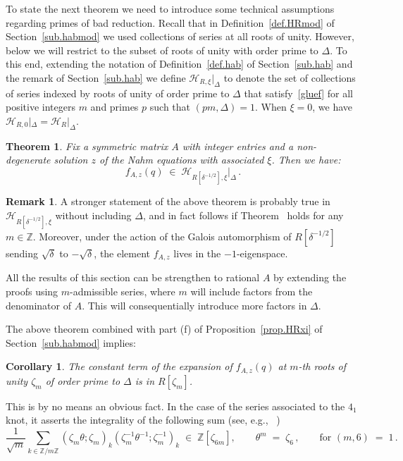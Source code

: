 \documentclass[12pt,reqno]{amsart}
\newcounter{theoremcount}
\newtheorem{theorem}[theoremcount]{Theorem}
\newtheorem{corollary}[proposition]{Corollary}
\theoremstyle{definition}
\newtheorem{remark}[proposition]{Remark}
\def\BZ{\mathbb Z}
\def\calH{\mathcal H}
\def\th{\theta}
\def\be{\begin{equation}}
\def\ee{\end{equation}}
\def\z{\zeta}
\def\={\;=\;}
\def\inn{\;\in\;}
\def\Phitof{f}
\begin{document}
To state the next theorem we need to introduce some technical assumptions regarding
primes of bad reduction. Recall that in Definition~\ref{def.HRmod} of
Section~\ref{sub.habmod} we used collections of series at all roots of unity.
However, below we will restrict to the subset of roots of unity with order prime
to $\Delta$. To this end, extending the notation of Definition~\ref{def.hab} of
Section~\ref{sub.hab} and the remark
of Section~\ref{sub.hab} we define $\calH_{R,\xi}|_\Delta$ to denote the set
of collections of series indexed by roots of unity of order
prime to $\Delta$ that satisfy~\eqref{gluef} for all positive integers $m$ and
primes $p$ such that $(pm,\Delta)=1$. When $\xi=0$, we have
$\calH_{R,0}|_\Delta = \calH_{R}|_\Delta$.

\begin{theorem}
\label{thm.2}
Fix a symmetric matrix $A$ with integer entries and a non-degenerate solution
$z$ of the Nahm equations with associated $\xi$. Then we have:
\be
\label{eq.thm2}
\Phitof_{A,z}(q) \inn \calH_{R[\delta^{-1/2}],\xi}|_{\Delta} \,.
\ee
\end{theorem}

\begin{remark}
A stronger statement of the above theorem is probably true in
$\calH_{R[\delta^{-1/2}],\xi}$ without including $\Delta$,
and in fact follows if Theorem~\cite[Thm.~1.6]{CGZ} holds for any $m\in\BZ$.
Moreover, under the action of the Galois automorphism of $R[\delta^{-1/2}]$
sending $\sqrt{\delta}$ to $-\sqrt{\delta}$, the element $\Phitof_{A,z}$ lives in
the $-1$-eigenspace.

All the results of this section can be strengthen to rational $A$ by extending the
proofs using $m$-admissible series, where $m$ will include factors from the
denominator of $A$. This will consequentially introduce more factors in $\Delta$.
\end{remark}

The above theorem combined with part (f) of Proposition~\ref{prop.HRxi} of
Section~\ref{sub.habmod} implies:

\begin{corollary}
\label{cor.cint}  
The constant term of the expansion of $\Phitof_{A,z}(q)$ at $m$-th roots of unity
$\z_m$ of order prime to $\Delta$ is in $R[\z_m]$.
\end{corollary}

\noindent This is by no means an obvious
fact. In the case of the series associated to the $4_1$ knot, it asserts
the integrality of the following sum (see, e.g., ~\cite[Eqn.(95)]{GZ:kashaev})
\be
\label{cherry41}
\frac{1}{\sqrt{m}}%
\sum_{k \in \BZ/m\BZ}
(\z_m \th;\z_m)_k (\z_m^{-1} \th^{-1};\z_m^{-1})_k \inn \BZ[\z_{6m}],
\qquad \th^m\=\z_6\,,
\qquad\text{for }(m,6)\=1\,.
\ee
\end{document}
